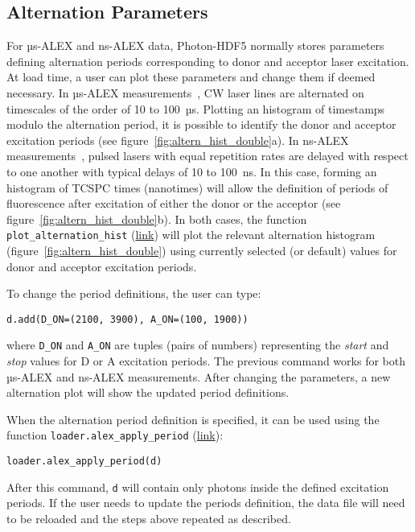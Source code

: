 \subsection{Alternation Parameters}
\label{sec:alternation}

For µs-ALEX and ns-ALEX data, Photon-HDF5 normally stores parameters defining
alternation periods corresponding to donor and acceptor laser excitation.
At load time, a user can plot these parameters and change them if deemed necessary.
In µs-ALEX measurements~\cite{Kapanidis_2004},
CW laser lines are alternated on timescales of the order of 10 to 100~µs.
Plotting an histogram of timestamps modulo the alternation period, it
is possible to identify the donor and acceptor excitation periods (see figure~\ref{fig:altern_hist_double}a).
In ns-ALEX measurements~\cite{Laurence_2005},
pulsed lasers with equal repetition rates are delayed with respect 
to one another with typical delays of 10 to 100~ns.
In this case, forming an histogram of TCSPC times (nanotimes) will allow 
the definition of periods of fluorescence after excitation 
of either the donor or the acceptor (see figure~\ref{fig:altern_hist_double}b).
In both cases, the function
\verb|plot_alternation_hist| 
(\href{http://fretbursts.readthedocs.org/en/latest/plots.html#fretbursts.burst_plot.plot_alternation_hist}{link})
will plot the relevant alternation histogram (figure~\ref{fig:altern_hist_double}) 
using currently selected (or default) values for donor and acceptor excitation periods.

To change the period definitions, the user can type:

\begin{lstlisting}
d.add(D_ON=(2100, 3900), A_ON=(100, 1900))
\end{lstlisting}

where \verb|D_ON| and \verb|A_ON| are tuples (pairs of numbers) representing
the \textit{start} and \textit{stop} values for D or A excitation periods.
The previous command works for both µs-ALEX and ns-ALEX measurements.
After changing the parameters, a new alternation plot will show the updated 
period definitions.

When the alternation period definition is specified, it can
be used using the function \verb|loader.alex_apply_period|
(\href{http://fretbursts.readthedocs.org/en/latest/loader.html#fretbursts.loader.alex_apply_period}{link}):

\begin{lstlisting}
loader.alex_apply_period(d)
\end{lstlisting}

After this command, \verb|d| will contain only photons inside the defined excitation periods.
If the user needs to update the periods definition, the data file will need to be 
reloaded and the steps above repeated as described.
